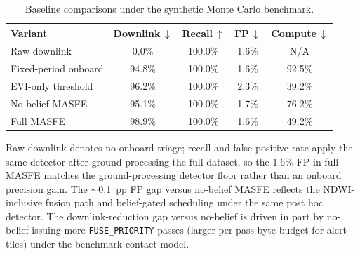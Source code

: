 \begin{table}[!htbp]
\centering
\caption{Baseline comparisons under the synthetic Monte Carlo benchmark.}
\label{tab:baselines}
\small
\setlength{\tabcolsep}{5pt}
\renewcommand{\arraystretch}{1.1}
\begin{tabular}{lcccc}
\toprule
Variant & Downlink\,$\downarrow$ & Recall\,$\uparrow$ & FP\,$\downarrow$ & Compute\,$\downarrow$ \\
\midrule
Raw downlink & 0.0\% & 100.0\% & 1.6\% & N/A \\
Fixed-period onboard & 94.8\% & 100.0\% & 1.6\% & 92.5\% \\
EVI-only threshold & 96.2\% & 100.0\% & 2.3\% & 39.2\% \\
No-belief MASFE & 95.1\% & 100.0\% & 1.7\% & 76.2\% \\
Full MASFE & 98.9\% & 100.0\% & 1.6\% & 49.2\% \\
\bottomrule
\end{tabular}
\end{table}
{\footnotesize Raw downlink denotes no onboard triage; recall and false-positive rate apply the same detector after ground-processing the full dataset, so the 1.6\% FP in full MASFE matches the ground-processing detector floor rather than an onboard precision gain. The $\sim$0.1~pp FP gap versus no-belief MASFE reflects the NDWI-inclusive fusion path and belief-gated scheduling under the same post hoc detector. The downlink-reduction gap versus no-belief is driven in part by no-belief issuing more \texttt{FUSE\_PRIORITY} passes (larger per-pass byte budget for alert tiles) under the benchmark contact model.}
